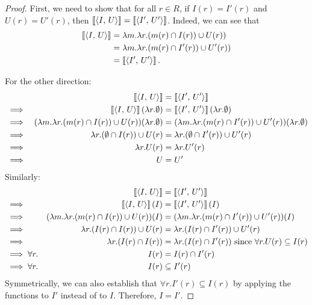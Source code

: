 \equalEq*
\begin{proof}
   First, we need to show that for all $r\in R$, if $I(r)=I'(r)$ and $U(r)=U'(r)$, then $\left\llbracket\left\langle I,\,U\right\rangle\right\rrbracket=\left\llbracket\left\langle I',\,U'\right\rangle\right\rrbracket$. Indeed, we can see that
    \begin{align*}
        \left\llbracket\left\langle I,\,U\right\rangle\right\rrbracket
       & = \lambda m. \lambda r. (m(r) \cap I(r))\cup U(r))\\
       & = \lambda m. \lambda r. (m(r) \cap I'(r))\cup U'(r))\\
       & = 
        \left\llbracket\left\langle I',\,U'\right\rangle\right\rrbracket.
    \end{align*}

For the other direction:
\begin{align*}
&&
    \left\llbracket\left\langle I,\,U\right\rangle\right\rrbracket &= \left\llbracket\left\langle I',\,U'\right\rangle\right\rrbracket\\
&\implies &
    \left\llbracket\left\langle I,\,U\right\rangle\right\rrbracket(\lambda r. \emptyset) &= \left\llbracket\left\langle I',\,U'\right\rangle\right\rrbracket(\lambda r. \emptyset)\\
&\implies &
(\lambda m.\lambda r.(m(r)\cap I(r))\cup U(r))(\lambda r.\emptyset) &=
(\lambda m.\lambda r.(m(r)\cap I'(r))\cup U'(r))(\lambda r.\emptyset) \\
&\implies &
\lambda r.(\emptyset \cap I(r))\cup U(r) &=
\lambda r.(\emptyset \cap I'(r))\cup U'(r) \\
&\implies &
\lambda r.U(r) &=
\lambda r.U'(r) \\
&\implies &
U &=
U' \\
\end{align*}
Similarly:
\begin{align*}
&&
    \left\llbracket\left\langle I,\,U\right\rangle\right\rrbracket &= \left\llbracket\left\langle I',\,U'\right\rangle\right\rrbracket\\
&\implies &
\left\llbracket\left\langle I,\,U\right\rangle\right\rrbracket(I) &= \left\llbracket\left\langle I',\,U'\right\rangle\right\rrbracket(I)\\
&\implies &
(\lambda m.\lambda r.(m(r)\cap I(r))\cup U(r))(I) &=
(\lambda m.\lambda r.(m(r)\cap I'(r))\cup U'(r))(I) \\
&\implies &
\lambda r.(I(r) \cap I(r))\cup U(r) &=
\lambda r.(I(r) \cap I'(r))\cup U'(r) \\
&\implies &
\lambda r.(I(r) \cap I(r)) &=
\lambda r.(I(r) \cap I'(r)) \textrm{ since $\forall r.U(r) \subseteq I(r)$} \\
&\implies \forall r.&
I(r) &= I(r) \cap I'(r)\\
&\implies \forall r.&
I(r) &\subseteq I'(r)\\
\end{align*}
Symmetrically, we can also establish that $\forall r.I'(r) \subseteq I(r)$ by applying the functions to $I'$ instead of to $I$. Therefore, $I = I'$.
\end{proof}

